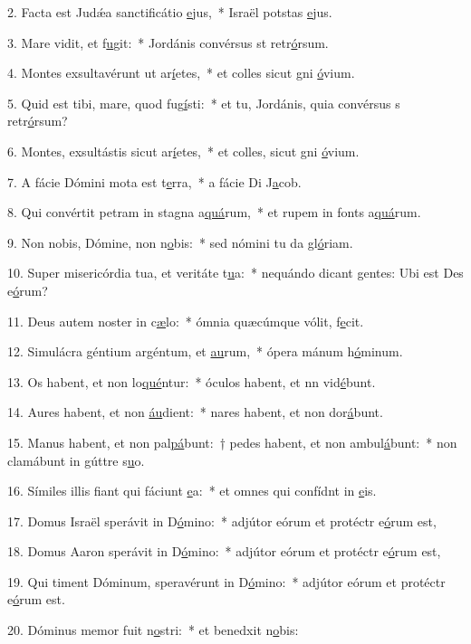2. Facta est Judǽa sanctificátio \uline{e}jus,~* Israël potstas \uline{e}jus.\par 
3. Mare vidit, et f\uline{u}git:~* Jordánis convérsus st retr\uline{ó}rsum.\par 
4. Montes exsultavérunt ut ar\uline{í}etes,~* et colles sicut gni \uline{ó}vium.\par 
5. Quid est tibi, mare, quod fug\uline{í}sti:~* et tu, Jordánis, quia convérsus s retr\uline{ó}rsum?\par 
6. Montes, exsultástis sicut ar\uline{í}etes,~* et colles, sicut gni \uline{ó}vium.\par 
7. A fácie Dómini mota est t\uline{e}rra,~* a fácie Di J\uline{a}cob.\par 
8. Qui convértit petram in stagna a\uline{quá}rum,~* et rupem in fonts a\uline{quá}rum.\par 
9. Non nobis, Dómine, non n\uline{o}bis:~* sed nómini tu da gl\uline{ó}riam.\par 
10. Super misericórdia tua, et veritáte t\uline{u}a:~* nequándo dicant gentes: Ubi est Des e\uline{ó}rum?\par 
11. Deus autem noster in c\uline{æ}lo:~* ómnia quæcúmque vólit, f\uline{e}cit.\par 
12. Simulácra géntium argéntum, et \uline{au}rum,~* ópera mánum h\uline{ó}minum.\par 
13. Os habent, et non lo\uline{qué}ntur:~* óculos habent, et nn vid\uline{é}bunt.\par 
14. Aures habent, et non \uline{áu}dient:~* nares habent, et non dor\uline{á}bunt.\par 
15. Manus habent, et non pal\uline{pá}bunt:~† pedes habent, et non ambul\uline{á}bunt:~* non clamábunt in gúttre s\uline{u}o.\par 
16. Símiles illis fiant qui fáciunt \uline{e}a:~* et omnes qui confídnt in \uline{e}is.\par 
17. Domus Israël sperávit in D\uline{ó}mino:~* adjútor eórum et protéctr e\uline{ó}rum est,\par 
18. Domus Aaron sperávit in D\uline{ó}mino:~* adjútor eórum et protéctr e\uline{ó}rum est,\par 
19. Qui timent Dóminum, speravérunt in D\uline{ó}mino:~* adjútor eórum et protéctr e\uline{ó}rum est.\par 
20. Dóminus memor fuit n\uline{o}stri:~* et benedxit n\uline{o}bis:\par 
